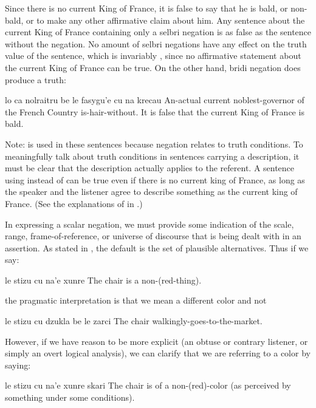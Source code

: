 Since there is no current King of France, it is false to say
    that he is bald, or non-bald, or to make any other affirmative
    claim about him. Any sentence about the current King of France
    containing only a selbri negation is as false as the sentence
    without the negation. No amount of selbri negations have any
    effect on the truth value of the sentence, which is invariably
    , since no affirmative statement about the current
    King of France can be true. On the other hand, bridi negation
    does produce a truth:
\begin{example}
lo ca nolraitru\n
\T	be le fasygu'e\n
\T	cu na krecau\n
An-actual current noblest-governor\n
\T	of the French Country\n
\T	{} is-hair-without.\n
It is false that the current King of France is bald.
\end{example}

Note:  is used in these sentences because negation
    relates to truth conditions. To meaningfully talk about truth
    conditions in sentences carrying a description, it must be
    clear that the description actually applies to the referent. A
    sentence using  instead of  can be true even if
    there is no current king of France, as long as the speaker and
    the listener agree to describe something as the current king of
    France. (See the explanations of  in .)



In expressing a scalar negation, we must provide some
    indication of the scale, range, frame-of-reference, or universe
    of discourse that is being dealt with in an assertion. As
    stated in , the default is the set
    of plausible alternatives. Thus if we say:
\begin{example}
le stizu cu na'e xunre\n
The chair is a non-(red-thing).
\end{example}

{\noindent}the pragmatic interpretation is that we mean a different color
    and not
\begin{example}
le stizu cu dzukla be le zarci\n
The chair walkingly-goes-to-the-market.
\end{example}

However, if we have reason to be more explicit (an obtuse or
    contrary listener, or simply an overt logical analysis), we can
    clarify that we are referring to a color by saying:
\begin{example}
le stizu cu na'e xunre skari\n
The chair is of a non-(red)-color\n
\T	(as perceived by something under some conditions).
\end{example}


